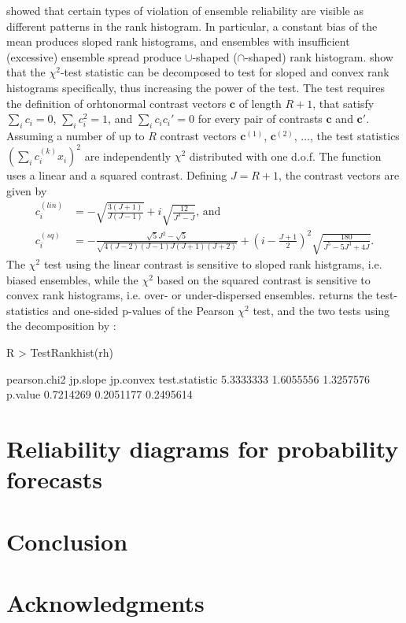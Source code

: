 \documentclass[article]{jss}
\begin{document}
\citet{hamill2001interpretation} showed that certain types of violation of ensemble reliability are visible as different patterns in the rank histogram.
In particular, a constant bias of the mean produces sloped rank histograms, and ensembles with insufficient (excessive) ensemble spread produce $\cup$-shaped ($\cap$-shaped) rank histogram.
\citet{jolliffe2008evaluating} show that the $\chi^2$-test statistic can be decomposed to test for sloped and convex rank histograms specifically, thus increasing the power of the test.
The test requires the definition of orhtonormal contrast vectors $\mathbf{c}$ of length $R+1$, that satisfy $\sum_i c_i = 0$, $\sum_i c_i^2 = 1$, and $\sum_i c_i c_i' = 0$ for every pair of contrasts $\mathbf{c}$ and $\mathbf{c}'$.
Assuming a number of up to $R$ contrast vectors $\mathbf{c}^{(1)}$, $\mathbf{c}^{(2)}$, $\dots$, the test statistics $(\sum_i c^{(k)}_i x_i)^2$ are independently $\chi^2$ distributed with one d.o.f. 
The function  uses a linear and a squared contrast. Defining $J=R+1$, the contrast vectors are given by
%
\begin{align}
c^{(lin)}_i & = -\sqrt{\frac{3(J+1)}{J (J-1)}} + i \sqrt{\frac{12}{J^3 - J}}\text{, and}\\
c^{(sq)}_i & =  - \frac{\sqrt{5}  J^2 - \sqrt{5}}{\sqrt{4(J - 2)  (J-1) J (J+1) (J+2)}}+ \left(i - \frac{J+1}{2}\right)^2   \sqrt{\frac{180}{ J^5 - 5 J^3 + 4 J}}.
\end{align}
%
The $\chi^2$ test using the linear contrast is sensitive to sloped rank histgrams, i.e. biased ensembles, while the $\chi^2$ based on the squared contrast is sensitive to convex rank histograms, i.e. over- or under-dispersed ensembles.
 returns the test-statistics and one-sided p-values of the Pearson $\chi^2$ test, and the two tests using the decomposition by \citet{jolliffe2008evaluating}:


\begin{Schunk}
\begin{Sinput}
R > TestRankhist(rh)
\end{Sinput}
\begin{Soutput}
               pearson.chi2  jp.slope jp.convex
test.statistic    5.3333333 1.6055556 1.3257576
p.value           0.7214269 0.2051177 0.2495614
\end{Soutput}
\end{Schunk}

\section{Reliability diagrams for probability forecasts}


\section{Conclusion}

\section*{Acknowledgments}



\end{document}
